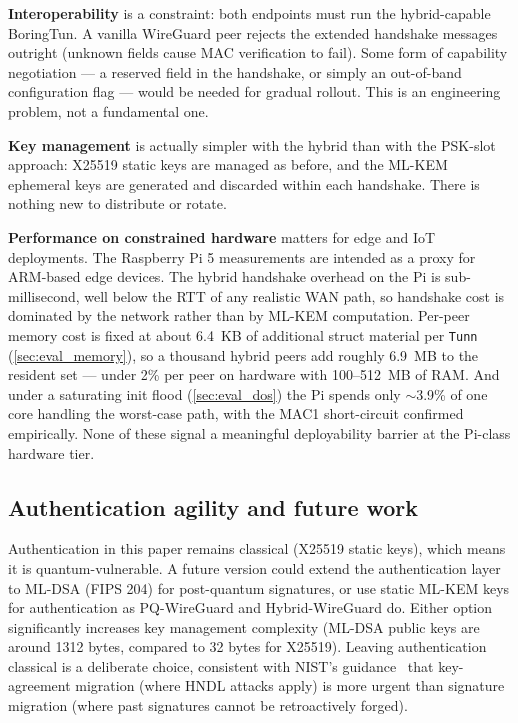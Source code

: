 \documentclass[11pt,a4paper]{article}
\begin{document}
\textbf{Interoperability} is a constraint: both endpoints must run the hybrid-capable BoringTun. A vanilla WireGuard peer rejects the extended handshake messages outright (unknown fields cause MAC verification to fail). Some form of capability negotiation --- a reserved field in the handshake, or simply an out-of-band configuration flag --- would be needed for gradual rollout. This is an engineering problem, not a fundamental one.

\textbf{Key management} is actually simpler with the hybrid than with the PSK-slot approach: X25519 static keys are managed as before, and the ML-KEM ephemeral keys are generated and discarded within each handshake. There is nothing new to distribute or rotate.

\textbf{Performance on constrained hardware} matters for edge and IoT deployments. The Raspberry Pi 5 measurements are intended as a proxy for ARM-based edge devices. The hybrid handshake overhead on the Pi is sub-millisecond, well below the RTT of any realistic WAN path, so handshake cost is dominated by the network rather than by ML-KEM computation. Per-peer memory cost is fixed at about 6.4~KB of additional struct material per \texttt{Tunn} (\cref{sec:eval_memory}), so a thousand hybrid peers add roughly 6.9~MB to the resident set --- under 2\% per peer on hardware with 100--512~MB of RAM. And under a saturating init flood (\cref{sec:eval_dos}) the Pi spends only $\sim$3.9\% of one core handling the worst-case path, with the MAC1 short-circuit confirmed empirically. None of these signal a meaningful deployability barrier at the Pi-class hardware tier.

\subsection{Authentication agility and future work}

Authentication in this paper remains classical (X25519 static keys), which means it is quantum-vulnerable. A future version could extend the authentication layer to ML-DSA (FIPS 204) for post-quantum signatures, or use static ML-KEM keys for authentication as PQ-WireGuard and Hybrid-WireGuard do. Either option significantly increases key management complexity (ML-DSA public keys are around 1312 bytes, compared to 32 bytes for X25519). Leaving authentication classical is a deliberate choice, consistent with NIST's guidance~\cite{nistir8547} that key-agreement migration (where HNDL attacks apply) is more urgent than signature migration (where past signatures cannot be retroactively forged).
\end{document}
